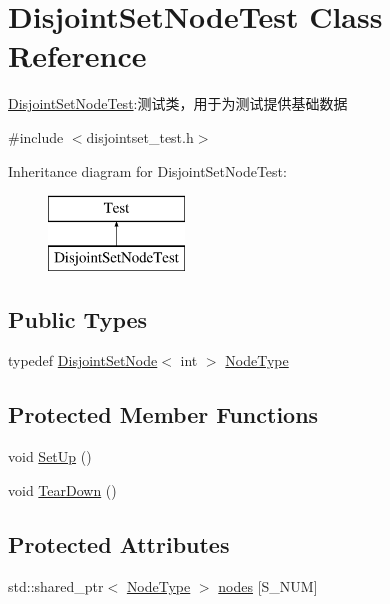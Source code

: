 \hypertarget{class_disjoint_set_node_test}{}\section{Disjoint\+Set\+Node\+Test Class Reference}
\label{class_disjoint_set_node_test}


\hyperlink{class_disjoint_set_node_test}{Disjoint\+Set\+Node\+Test}\+:测试类，用于为测试提供基础数据  




{\ttfamily \#include $<$disjointset\+\_\+test.\+h$>$}

Inheritance diagram for Disjoint\+Set\+Node\+Test\+:\begin{figure}[H]
\begin{center}
\leavevmode
\includegraphics[height=2.000000cm]{class_disjoint_set_node_test}
\end{center}
\end{figure}
\subsection*{Public Types}
\begin{DoxyCompactItemize}
\item 
typedef \hyperlink{struct_introduction_to_algorithm_1_1_set_algorithm_1_1_disjoint_set_node}{Disjoint\+Set\+Node}$<$ int $>$ \hyperlink{class_disjoint_set_node_test_a2f0849289c8020ac6e4ef918b7f2cbde}{Node\+Type}
\end{DoxyCompactItemize}
\subsection*{Protected Member Functions}
\begin{DoxyCompactItemize}
\item 
void \hyperlink{class_disjoint_set_node_test_a6deb2278f038f2fb93f33c9415d757e9}{Set\+Up} ()
\item 
void \hyperlink{class_disjoint_set_node_test_ab6fd5a639f421653273b483a30a3e264}{Tear\+Down} ()
\end{DoxyCompactItemize}
\subsection*{Protected Attributes}
\begin{DoxyCompactItemize}
\item 
std\+::shared\+\_\+ptr$<$ \hyperlink{class_disjoint_set_node_test_a2f0849289c8020ac6e4ef918b7f2cbde}{Node\+Type} $>$ \hyperlink{class_disjoint_set_node_test_ae4bf8c2dd6ec1c63cdef65562fb5a278}{nodes} \mbox{[}S\+\_\+\+N\+U\+M\mbox{]}
\end{DoxyCompactItemize}


